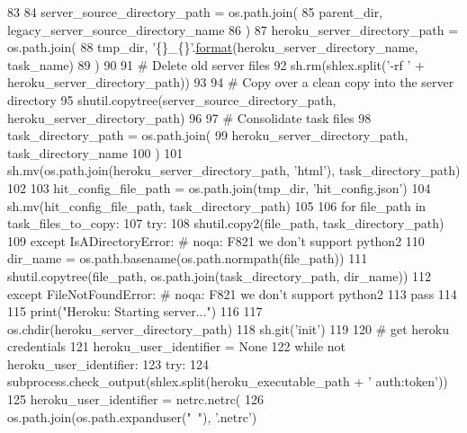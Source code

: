 \begin{DoxyCode}
83 
84     server\_source\_directory\_path = os.path.join(
85         parent\_dir, legacy\_server\_source\_directory\_name
86     )
87     heroku\_server\_directory\_path = os.path.join(
88         tmp\_dir, \textcolor{stringliteral}{'\{\}\_\{\}'}.\hyperlink{namespaceparlai_1_1chat__service_1_1services_1_1messenger_1_1shared__utils_a32e2e2022b824fbaf80c747160b52a76}{format}(heroku\_server\_directory\_name, task\_name)
89     )
90 
91     \textcolor{comment}{# Delete old server files}
92     sh.rm(shlex.split(\textcolor{stringliteral}{'-rf '} + heroku\_server\_directory\_path))
93 
94     \textcolor{comment}{# Copy over a clean copy into the server directory}
95     shutil.copytree(server\_source\_directory\_path, heroku\_server\_directory\_path)
96 
97     \textcolor{comment}{# Consolidate task files}
98     task\_directory\_path = os.path.join(
99         heroku\_server\_directory\_path, task\_directory\_name
100     )
101     sh.mv(os.path.join(heroku\_server\_directory\_path, \textcolor{stringliteral}{'html'}), task\_directory\_path)
102 
103     hit\_config\_file\_path = os.path.join(tmp\_dir, \textcolor{stringliteral}{'hit\_config.json'})
104     sh.mv(hit\_config\_file\_path, task\_directory\_path)
105 
106     \textcolor{keywordflow}{for} file\_path \textcolor{keywordflow}{in} task\_files\_to\_copy:
107         \textcolor{keywordflow}{try}:
108             shutil.copy2(file\_path, task\_directory\_path)
109         \textcolor{keywordflow}{except} IsADirectoryError:  \textcolor{comment}{# noqa: F821 we don't support python2}
110             dir\_name = os.path.basename(os.path.normpath(file\_path))
111             shutil.copytree(file\_path, os.path.join(task\_directory\_path, dir\_name))
112         \textcolor{keywordflow}{except} FileNotFoundError:  \textcolor{comment}{# noqa: F821 we don't support python2}
113             \textcolor{keywordflow}{pass}
114 
115     print(\textcolor{stringliteral}{"Heroku: Starting server..."})
116 
117     os.chdir(heroku\_server\_directory\_path)
118     sh.git(\textcolor{stringliteral}{'init'})
119 
120     \textcolor{comment}{# get heroku credentials}
121     heroku\_user\_identifier = \textcolor{keywordtype}{None}
122     \textcolor{keywordflow}{while} \textcolor{keywordflow}{not} heroku\_user\_identifier:
123         \textcolor{keywordflow}{try}:
124             subprocess.check\_output(shlex.split(heroku\_executable\_path + \textcolor{stringliteral}{' auth:token'}))
125             heroku\_user\_identifier = netrc.netrc(
126                 os.path.join(os.path.expanduser(\textcolor{stringliteral}{"~"}), \textcolor{stringliteral}{'.netrc'})

\end{DoxyCode}

